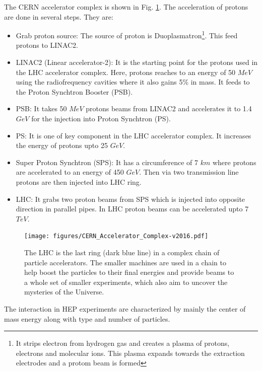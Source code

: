 The CERN accelerator complex is shown in Fig. \ref{fig:CERN-accelerator-complex}.  The acceleration of protons are done in several steps.  They are:
\begin{itemize}
    \item Grab proton source: The source of proton is Duoplasmatron\footnote{It strips electron from hydrogen gas and creates a plasma of protons, electrons and molecular ions. This plasma expands towards the extraction electrodes and a protom beam is formed}\cite{LHC-tdr-vol3}. This feed protons to LINAC2.
    \item LINAC2 (Linear accelerator-2): It is the starting point for the protons used in the LHC accelerator complex. Here, protons reaches to an energy of 50 $MeV$ using the radiofrequency cavities where it also gains 5\% in mass. It feeds to the Proton Synchtron Booster (PSB).
    \item PSB: It takes 50 $MeV$ protons beams from LINAC2 and accelerates it to 1.4 $GeV$ for the injection into Proton Synchtron (PS).
    \item PS: It is one of key component in the LHC accelerator complex. It increases the energy of protons upto 25 $GeV$.
    \item Super Proton Synchtron (SPS): It has a circumference of 7 $km$ where protons are accelerated to an energy of 450 $GeV$. Then via two transmission line protons are then injected into LHC ring.
    \item LHC: It grabs two proton beams from SPS which is injected into opposite direction in parallel pipes. In LHC proton beams can be accelerated upto 7 $TeV$.
\end{itemize}
\begin{figure}[!ht]
  \texttt{[image: figures/CERN\_Accelerator\_Complex-v2016.pdf]}
  \caption{The LHC is the last ring (dark blue line) in a complex chain of particle accelerators. The smaller machines are used in a chain to help boost the particles to their final energies and provide beams to a whole set of smaller experiments, which also aim to uncover the mysteries of the Universe. \cite{Fig-CERN-accelerator-complex}}
  \label{fig:CERN-accelerator-complex}
\end{figure}



The interaction in HEP experiments are characterized by mainly the center of mass energy along with type and number of particles.


